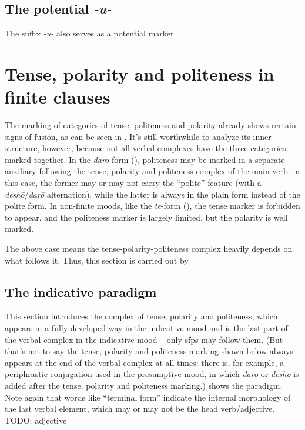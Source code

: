 \documentclass[UTF8, a4paper, oneside, scheme=plain]{ctexrep}
\newcommand{\corpus}[1]{\emph{#1}}
\begin{document}
\subsection{The potential \corpus{-u-}}

The suffix \corpus{-u-} also serves as a potential marker.

\section{Tense, polarity and politeness in finite clauses}\label{sec:tense-polarity-polite}

The marking of categories of tense, politeness and polarity 
already shows certain signs of fusion,
as can be seen in .
It's still worthwhile to analyze its inner structure, however,
because not all verbal complexes have the three categories marked together.
In the \corpus{dar\={o}} form (),
politeness may be marked in a separate auxiliary following 
the tense, polarity and politeness complex of the main verb:
in this case, the former may or may not carry the ``polite'' feature
(with a \corpus{desh\={o}}/\corpus{dar\={o}} alternation),
while the latter is always in the plain form instead of the polite form.
In non-finite moods, like the \corpus{te}-form (), 
the tense marker is forbidden to appear,
and the politeness marker is largely limited,
but the polarity is well marked.

The above case means the tense-polarity-politeness complex heavily depends on what follows it.
Thus, this section is carried out by 

\subsection{The indicative paradigm}\label{sec:indicative-paradigm}

This section introduces the complex of tense, polarity and politeness,
which appears in a fully developed way in the indicative mood
and is the last part of the verbal complex in the indicative mood
-- only \ac{sfp}s may follow them.
(But that's not to say the tense, polarity and politeness marking shown below
always appears at the end of the verbal complex at all times:
there is, for example, a periphrastic conjugation used in the presumptive mood, 
in which \corpus{dar\={o}} or \corpus{desho} is added after the tense, polarity and politeness marking.)
 shows the paradigm. 
Note again that words like ``terminal form'' indicate the internal morphology 
of the last verbal element, 
which may or may not be the head verb/adjective.
TODO: adjective
\end{document}
